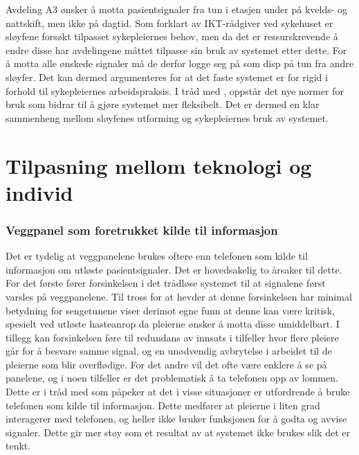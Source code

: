 \noindent
Avdeling A3 ønsker å motta pasientsignaler fra tun i etasjen under på kvelds- og nattskift, men ikke på dagtid. Som forklart av IKT-rådgiver ved sykehuset er sløyfene forsøkt tilpasset sykepleiernes behov, men da det er ressurskrevende å endre disse har avdelingene måttet tilpasse sin bruk av systemet etter dette. For å motta alle ønskede signaler må de derfor logge seg på som disp på tun fra andre sløyfer. Det kan dermed argumenteres for at det faste systemet er for rigid i forhold til sykepleiernes arbeidspraksis. I tråd med \citep{Ackermann00}, oppstår det nye normer for bruk som bidrar til å gjøre systemet mer fleksibelt. Det er dermed en klar sammenheng mellom sløyfenes utforming og sykepleiernes bruk av systemet.

\section{Tilpasning mellom teknologi og individ}

\subsubsection{Veggpanel som foretrukket kilde til informasjon}
Det er tydelig at veggpanelene brukes oftere enn telefonen som kilde til informasjon om utløste pasientsignaler. Det er hovedsakelig to årsaker til dette. For det første fører forsinkelsen i det trådløse systemet til at signalene først varsles på veggpanelene. Til tross for at \citet{Sletten09} hevder at denne forsinkelsen har minimal betydning for sengetunene viser derimot egne funn at denne kan være kritisk, spesielt ved utløste hasteanrop da pleierne ønsker å motta disse umiddelbart. I tillegg kan forsinkelsen føre til redundans av innsats i tilfeller hvor flere pleiere går for å besvare samme signal, og en unødvendig avbrytelse i arbeidet til de pleierne som blir overflødige. For det andre vil det ofte være enklere å se på panelene, og i noen tilfeller er det problematisk å ta telefonen opp av lommen.  Dette er i tråd med \citet{klemets13} som påpeker at det i visse situasjoner er utfordrende å bruke telefonen som kilde til informasjon. Dette medfører at pleierne i liten grad interagerer med telefonen, og heller ikke bruker funksjonen for å godta og avvise signaler. Dette gir mer støy som et resultat av at systemet ikke brukes slik det er tenkt.

